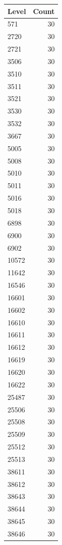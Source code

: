 \begin{table}[ht]
\centering
\begin{tabular}{lr}
  \hline
Level & Count \\ 
  \hline
571 &  30 \\ 
  2720 &  30 \\ 
  2721 &  30 \\ 
  3506 &  30 \\ 
  3510 &  30 \\ 
  3511 &  30 \\ 
  3521 &  30 \\ 
  3530 &  30 \\ 
  3532 &  30 \\ 
  3667 &  30 \\ 
  5005 &  30 \\ 
  5008 &  30 \\ 
  5010 &  30 \\ 
  5011 &  30 \\ 
  5016 &  30 \\ 
  5018 &  30 \\ 
  6898 &  30 \\ 
  6900 &  30 \\ 
  6902 &  30 \\ 
  10572 &  30 \\ 
  11642 &  30 \\ 
  16546 &  30 \\ 
  16601 &  30 \\ 
  16602 &  30 \\ 
  16610 &  30 \\ 
  16611 &  30 \\ 
  16612 &  30 \\ 
  16619 &  30 \\ 
  16620 &  30 \\ 
  16622 &  30 \\ 
  25487 &  30 \\ 
  25506 &  30 \\ 
  25508 &  30 \\ 
  25509 &  30 \\ 
  25512 &  30 \\ 
  25513 &  30 \\ 
  38611 &  30 \\ 
  38612 &  30 \\ 
  38643 &  30 \\ 
  38644 &  30 \\ 
  38645 &  30 \\ 
  38646 &  30 \\ 

\end{tabular}
\end{table}
